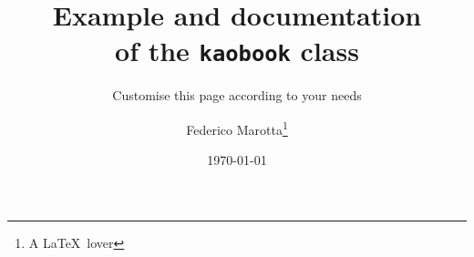 \documentclass[draft,appendixprefix=true]{kaobook}
\begin{document}

\titlehead{The \texttt{kaobook} class}
\subject{Use this document as a template}

\title[Example and documentation of the {\normalfont\texttt{kaobook}} class]{Example and documentation \\ of the {\normalfont\texttt{kaobook}} class}
\subtitle{Customise this page according to your needs}

\author[Federico Marotta]{Federico Marotta\thanks{A \LaTeX\ lover}}
\date{\today}

\publishers{An Awesome Publisher}




\makeatletter
\uppertitleback{\@titlehead} %
\end{document}
